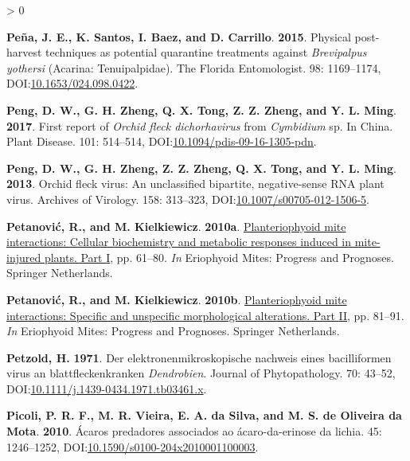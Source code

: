 \documentclass{ufdissertation}[overrideChapters] %
\newlength{\cslhangindent}
\newenvironment{CSLReferences}[2] %
 {%
  \setlength{\parindent}{0pt}
  \ifodd #1 \everypar{\setlength{\hangindent}{\cslhangindent}}\ignorespaces\fi
  \ifnum #2 > 0
  \setlength{\parskip}{#2\baselineskip}
  \fi
 }%
 {}
\begin{document}
{\begin{CSLReferences}{1}{1}
\leavevmode{}%
\textbf{Peña, J. E., K. Santos, I. Baez, and D. Carrillo}. \textbf{2015}. Physical post-harvest techniques as potential quarantine treatments against {\emph{Brevipalpus yothersi}} ({Acarina}: {Tenuipalpidae}). The Florida Entomologist. 98: 1169--1174, DOI:\href{https://doi.org/10.1653/024.098.0422}{10.1653/024.098.0422}.

\leavevmode{}%
\textbf{Peng, D. W., G. H. Zheng, Q. X. Tong, Z. Z. Zheng, and Y. L. Ming}. \textbf{2017}. First report of {\emph{Orchid fleck dichorhavirus}} from {\emph{Cymbidium}} sp. In {China}. Plant Disease. 101: 514--514, DOI:\href{https://doi.org/10.1094/pdis-09-16-1305-pdn}{10.1094/pdis-09-16-1305-pdn}.

\leavevmode{}%
\textbf{Peng, D. W., G. H. Zheng, Z. Z. Zheng, Q. X. Tong, and Y. L. Ming}. \textbf{2013}. {Orchid fleck virus}: An unclassified bipartite, negative-sense {RNA} plant virus. Archives of Virology. 158: 313--323, DOI:\href{https://doi.org/10.1007/s00705-012-1506-5}{10.1007/s00705-012-1506-5}.

\leavevmode{}%
\textbf{Petanović, R., and M. Kielkiewicz}. \textbf{2010a}. \href{https://doi.org/10.1007/978-90-481-9562-6_4}{Plant{\textendash}eriophyoid mite interactions: Cellular biochemistry and metabolic responses induced in mite-injured plants. Part {I}}, pp. 61--80. \emph{In} Eriophyoid Mites: Progress and Prognoses. Springer Netherlands.

\leavevmode{}%
\textbf{Petanović, R., and M. Kielkiewicz}. \textbf{2010b}. \href{https://doi.org/10.1007/978-90-481-9562-6_5}{Plant{\textendash}eriophyoid mite interactions: Specific and unspecific morphological alterations. Part {II}}, pp. 81--91. \emph{In} Eriophyoid Mites: Progress and Prognoses. Springer Netherlands.

\leavevmode{}%
\textbf{Petzold, H.} \textbf{1971}. Der elektronenmikroskopische nachweis eines bacilliformen virus an blattfleckenkranken {\emph{Dendrobien}}. Journal of Phytopathology. 70: 43--52, DOI:\href{https://doi.org/10.1111/j.1439-0434.1971.tb03461.x}{10.1111/j.1439-0434.1971.tb03461.x}.

\leavevmode{}%
\textbf{Picoli, P. R. F., M. R. Vieira, E. A. da Silva, and M. S. de Oliveira da Mota}. \textbf{2010}. {Á}caros predadores associados ao {á}caro-da-erinose da lichia. 45: 1246--1252, DOI:\href{https://doi.org/10.1590/s0100-204x2010001100003}{10.1590/s0100-204x2010001100003}.


\end{CSLReferences}}
\end{document}
